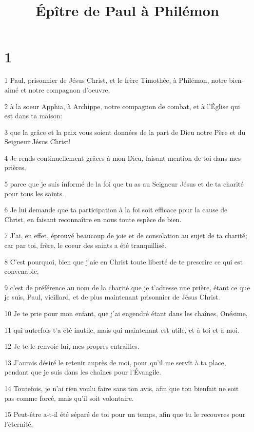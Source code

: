 

\title{Épître de Paul à Philémon}


\chapter{1}

\par 1 Paul, prisonnier de Jésus Christ, et le frère Timothée, à Philémon, notre bien-aimé et notre compagnon d'oeuvre,
\par 2 à la soeur Apphia, à Archippe, notre compagnon de combat, et à l'Église qui est dans ta maison:
\par 3 que la grâce et la paix vous soient données de la part de Dieu notre Père et du Seigneur Jésus Christ!
\par 4 Je rends continuellement grâces à mon Dieu, faisant mention de toi dans mes prières,
\par 5 parce que je suis informé de la foi que tu as au Seigneur Jésus et de ta charité pour tous les saints.
\par 6 Je lui demande que ta participation à la foi soit efficace pour la cause de Christ, en faisant reconnaître en nous toute espèce de bien.
\par 7 J'ai, en effet, éprouvé beaucoup de joie et de consolation au sujet de ta charité; car par toi, frère, le coeur des saints a été tranquillisé.
\par 8 C'est pourquoi, bien que j'aie en Christ toute liberté de te prescrire ce qui est convenable,
\par 9 c'est de préférence au nom de la charité que je t'adresse une prière, étant ce que je suis, Paul, vieillard, et de plus maintenant prisonnier de Jésus Christ.
\par 10 Je te prie pour mon enfant, que j'ai engendré étant dans les chaînes, Onésime,
\par 11 qui autrefois t'a été inutile, mais qui maintenant est utile, et à toi et à moi.
\par 12 Je te le renvoie lui, mes propres entrailles.
\par 13 J'aurais désiré le retenir auprès de moi, pour qu'il me servît à ta place, pendant que je suis dans les chaînes pour l'Évangile.
\par 14 Toutefois, je n'ai rien voulu faire sans ton avis, afin que ton bienfait ne soit pas comme forcé, mais qu'il soit volontaire.
\par 15 Peut-être a-t-il été séparé de toi pour un temps, afin que tu le recouvres pour l'éternité,
